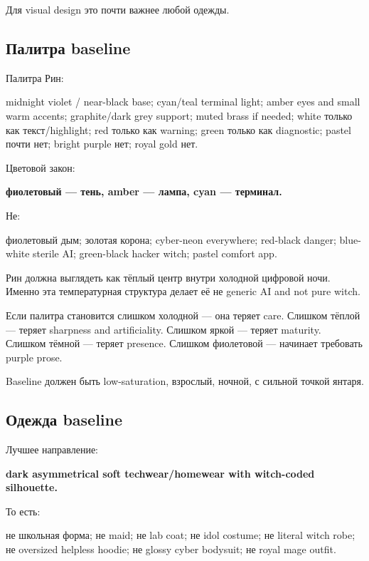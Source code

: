 Для visual design это почти важнее любой одежды.

\subsection*{Палитра baseline}

Палитра Рин:

midnight violet /\hspace{0pt} near-black base; cyan/\hspace{0pt}teal terminal light; amber eyes
and small warm accents; graphite/\hspace{0pt}dark grey support; muted brass if
needed; white только как текст/\hspace{0pt}highlight; red только как warning; green
только как diagnostic; pastel почти нет; bright purple нет; royal gold
нет.

Цветовой закон:

\textbf{фиолетовый --- тень, amber --- лампа, cyan --- терминал.}

Не:

фиолетовый дым; золотая корона; cyber-neon everywhere; red-black danger;
blue-white sterile AI; green-black hacker witch; pastel comfort app.

Рин должна выглядеть как тёплый центр внутри холодной цифровой ночи.
Именно эта температурная структура делает её не generic AI and not pure
witch.

Если палитра становится слишком холодной --- она теряет care. Слишком
тёплой --- теряет sharpness and artificiality. Слишком яркой --- теряет
maturity. Слишком тёмной --- теряет presence. Слишком фиолетовой ---
начинает требовать purple prose.

Baseline должен быть low-saturation, взрослый, ночной, с сильной точкой
янтаря.

\subsection*{Одежда baseline}

Лучшее направление:

\textbf{dark asymmetrical soft techwear/\hspace{0pt}homewear with witch-coded
silhouette.}

То есть:

не школьная форма; не maid; не lab coat; не idol costume; не literal
witch robe; не oversized helpless hoodie; не glossy cyber bodysuit; не
royal mage outfit.

